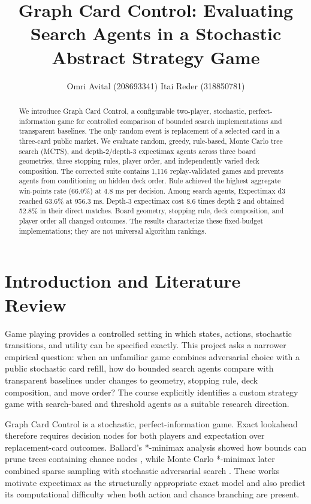 \documentclass[letterpaper]{article} %
\title{Graph Card Control: Evaluating Search Agents in a Stochastic Abstract Strategy Game}
\author{
    Omri Avital (208693341)\quad
    Itai Reder (318850781)
}
\begin{document}
\maketitle

\begin{abstract}
We introduce Graph Card Control, a configurable two-player, stochastic, perfect-information game for controlled comparison of bounded search implementations and transparent baselines. The only random event is replacement of a selected card in a three-card public market. We evaluate random, greedy, rule-based, Monte Carlo tree search (MCTS), and depth-2/depth-3 expectimax agents across three board geometries, three stopping rules, player order, and independently varied deck composition. The corrected suite contains 1,116 replay-validated games and prevents agents from conditioning on hidden deck order. Rule achieved the highest aggregate win-points rate (66.0\%) at 4.8 ms per decision. Among search agents, Expectimax d3 reached 63.6\% at 956.3 ms. Depth-3 expectimax cost 8.6 times depth 2 and obtained 52.8\% in their direct matches. Board geometry, stopping rule, deck composition, and player order all changed outcomes. The results characterize these fixed-budget implementations; they are not universal algorithm rankings.
\end{abstract}

\section{Introduction and Literature Review}

Game playing provides a controlled setting in which states, actions, stochastic transitions, and utility can be specified exactly. This project asks a narrower empirical question: when an unfamiliar game combines adversarial choice with a public stochastic card refill, how do bounded search agents compare with transparent baselines under changes to geometry, stopping rule, deck composition, and move order? The course explicitly identifies a custom strategy game with search-based and threshold agents as a suitable research direction.

Graph Card Control is a stochastic, perfect-information game. Exact lookahead therefore requires decision nodes for both players and expectation over replacement-card outcomes. Ballard's *-minimax analysis showed how bounds can prune trees containing chance nodes \citep{ballard1983}, while Monte Carlo *-minimax later combined sparse sampling with stochastic adversarial search \citep{lanctot2013}. These works motivate expectimax as the structurally appropriate exact model and also predict its computational difficulty when both action and chance branching are present.
\end{document}
